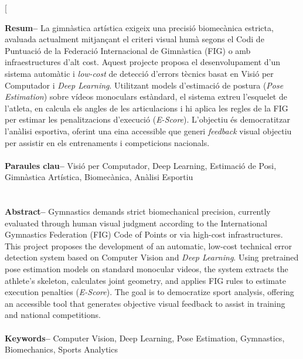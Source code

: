 \documentclass[10pt,a4paper,twocolumn,twoside]{article}
\begin{document}
\twocolumn[\begin{@twocolumnfalse}

\maketitle

\thispagestyle{primerapagina}

\begin{center}
\parbox{0.915\textwidth}
{\sffamily
\textbf{Resum--}
La gimnàstica artística exigeix una precisió biomecànica estricta, avaluada actualment mitjançant el criteri visual humà segons el Codi de Puntuació de la Federació Internacional de Gimnàstica (FIG) o amb infraestructures d'alt cost. Aquest projecte proposa el desenvolupament d'un sistema automàtic i \textit{low-cost} de detecció d'errors tècnics basat en Visió per Computador i \textit{Deep Learning}. Utilitzant models d'estimació de postura (\textit{Pose Estimation}) sobre vídeos monoculars estàndard, el sistema extreu l'esquelet de l'atleta, en calcula els angles de les articulacions i hi aplica les regles de la FIG per estimar les penalitzacions d'execució (\textit{E-Score}). L'objectiu és democratitzar l'anàlisi esportiva, oferint una eina accessible que generi \textit{feedback} visual objectiu per assistir en els entrenaments i competicions nacionals.  
\\
\\
\textbf{Paraules clau-- } Visió per Computador, Deep Learning, Estimació de Posi, Gimnàstica Artística, Biomecànica, Anàlisi Esportiu\\
\\

\bigskip
\\
\textbf{Abstract--} Gymnastics demands strict biomechanical precision, currently evaluated through human visual judgment according to the International Gymnastics Federation (FIG) Code of Points or via high-cost infrastructures. This project proposes the development of an automatic, low-cost technical error detection system based on Computer Vision and \textit{Deep Learning}. Using pretrained pose estimation models on standard monocular videos, the system extracts the athlete's skeleton, calculates joint geometry, and applies FIG rules to estimate execution penalties (\textit{E-Score}). The goal is to democratize sport analysis, offering an accessible tool that generates objective visual feedback to assist in training and national competitions. 
\\
\\
\textbf{Keywords-- } Computer Vision, Deep Learning, Pose Estimation, Gymnastics, Biomechanics, Sports Analytics\\
}


\end{center}
\end{@twocolumnfalse}
\end{document}
